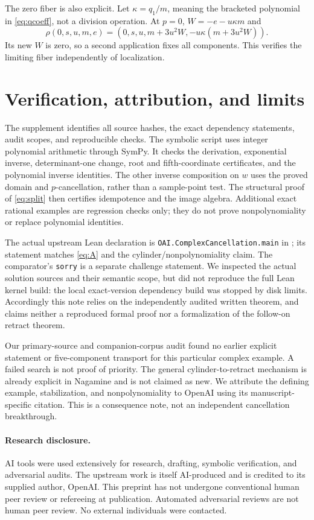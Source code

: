 \documentclass[11pt]{article}
\begin{document}
The zero fiber is also explicit. Let $\kappa=q_1/m$, meaning the
bracketed polynomial in \eqref{eq:qcoeff}, not a division operation.
At $p=0$, $W=-e-u\kappa m$ and
\[
\rho(0,s,u,m,e)=(0,s,u,m+3u^2W,-u\kappa(m+3u^2W)).
\]
Its new $W$ is zero, so a second application fixes all components.
This verifies the limiting fiber independently of localization.

\section{Verification, attribution, and limits}
The supplement identifies all source hashes, the exact dependency
statements, audit scopes, and reproducible checks. The symbolic script
uses integer polynomial arithmetic through SymPy. It checks the
derivation, exponential inverse, determinant-one change, root and
fifth-coordinate certificates, and the polynomial inverse identities.
The other inverse composition on $w$ uses the proved domain and
$p$-cancellation, rather than a sample-point test. The structural proof
of \eqref{eq:split} then certifies idempotence and the image algebra.
Additional exact rational examples are regression checks only; they do
not prove nonpolynomiality or replace polynomial identities.

The actual upstream Lean declaration is
\texttt{OAI.ComplexCancellation.main} in
; its statement matches
\eqref{eq:A} and the cylinder/nonpolynomiality claim. The comparator's
\texttt{sorry} is a separate challenge statement. We inspected the
actual solution sources and their semantic scope, but did not reproduce
the full Lean kernel build: the local exact-version dependency build
was stopped by disk limits. Accordingly this note relies on the
independently audited written theorem, and claims neither a reproduced
formal proof nor a formalization of the follow-on retract theorem.

Our primary-source and companion-corpus audit found no earlier explicit
statement or five-component transport for this particular complex
example. A failed search is not proof of priority. The general
cylinder-to-retract mechanism is already explicit in Nagamine and is
not claimed as new. We attribute the defining example, stabilization,
and nonpolynomiality to OpenAI using its manuscript-specific citation.
This is a consequence note, not an independent cancellation breakthrough.

\paragraph{Research disclosure.}
AI tools were used extensively for research, drafting, symbolic
verification, and adversarial audits. The upstream work is itself
AI-produced and is credited to its supplied author, OpenAI.
This preprint has not undergone conventional human peer review or
refereeing at publication. Automated adversarial reviews are not human
peer review. No external individuals were contacted.
\end{document}
